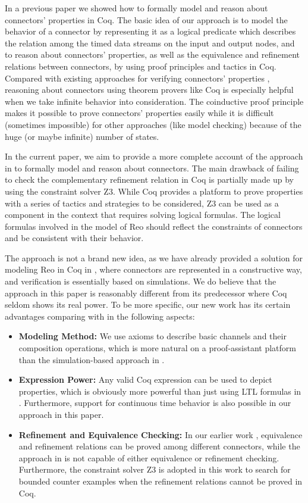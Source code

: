\documentclass[preprint,3p]{elsarticle}
\begin{document}
In a previous paper \cite{ZHL+17} we showed how to formally model and reason about connectors' properties in Coq. The basic idea of our approach is to model the behavior of a connector by representing it as a logical predicate which describes the relation among the timed data streams on the input and output nodes, and to reason about connectors' properties, as well as the equivalence and refinement relations between connectors, by using proof principles and tactics in Coq. Compared with existing approaches for verifying connectors' properties \cite{BBK+10,KB09,KKV12}, reasoning about connectors using theorem provers like Coq is especially helpful when we take infinite behavior into consideration. The coinductive proof principle makes it possible to prove connectors' properties easily while it is difficult (sometimes impossible) for other approaches (like model checking) because of the huge (or maybe infinite) number of states.

In the current paper, we aim to provide a more complete account of the approach in \cite{ZHL+17} to formally model and reason about connectors. The main drawback of failing to check the complementary refinement relation in Coq is partially made up by using the constraint solver Z3. While Coq provides a platform to prove properties with a series of tactics and strategies to be considered, Z3 can be used as a component in the context %
that requires solving logical formulas. The logical formulas involved in the model of Reo should reflect the constraints of connectors and be consistent with their behavior.

The approach is not a brand new idea, as we have already provided a solution for modeling Reo in Coq in \cite{LS15}, where connectors are represented in a constructive way, and verification is essentially based on simulations. We do believe that the approach in this paper is reasonably different from its predecessor \cite{LS15} where Coq seldom shows its real power. To be more specific, our new work has its certain
advantages comparing with \cite{LS15} in the following aspects:
\begin{itemize}
\item {\bf Modeling Method:} We use axioms to describe basic channels and their composition operations, which is more natural on a proof-assistant platform than the simulation-based approach in \cite{LS15}.
\item {\bf Expression Power:} Any valid Coq expression can be used to depict properties, which is obviously more powerful than just using LTL formulas in \cite{LS15}. Furthermore, support for continuous time behavior is also possible in our approach in this paper.
\item {\bf Refinement and Equivalence Checking:} In our earlier work \cite{ZHL+17}, equivalence and refinement relations can be proved among different connectors, while the approach in \cite{LS15} is not capable of either equivalence or refinement checking. Furthermore, the constraint solver Z3 is adopted in this work to search for bounded counter examples when the refinement relations cannot be proved in Coq.
\end{itemize}
\end{document}
